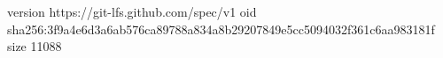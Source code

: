version https://git-lfs.github.com/spec/v1
oid sha256:3f9a4e6d3a6ab576ca89788a834a8b29207849e5cc5094032f361c6aa983181f
size 11088

